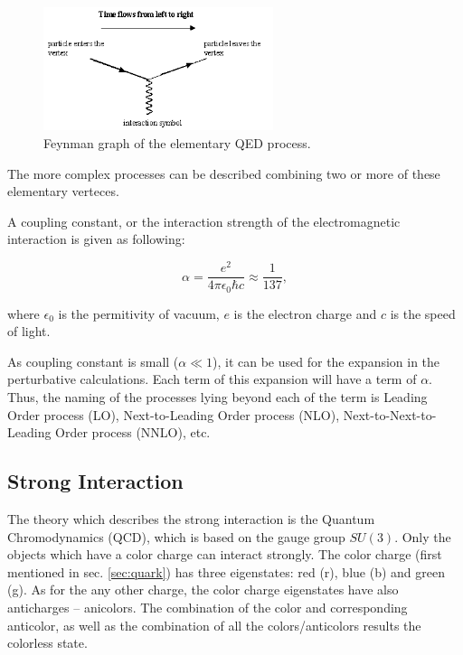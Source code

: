 \begin{figure}[h]
  \centering
  \includegraphics[width=0.6\textwidth]{01_Theory_SM/plots/QED_simple.png}
  \caption{Feynman graph of the elementary QED process.}
  \label{fig:QED_simple}
\end{figure}

The more complex processes can be described combining two or more of these elementary verteces.

A coupling constant, or the interaction strength of the electromagnetic interaction is given as following:

\begin{equation}
 \alpha = \frac{e^{2}}{4\pi\epsilon_{0}\hbar c} \approx \frac{1}{137},
\end{equation}

where $\epsilon_{0}$ is the permitivity of vacuum, $e$ is the electron charge and $c$ is the speed of light.

As coupling constant is small ($\alpha \ll 1$), it can be used for the expansion in the perturbative calculations.
Each term of this expansion will have a term of $\alpha$. Thus, the naming of the processes lying beyond each of the term
is Leading Order process (LO), Next-to-Leading Order process (NLO), Next-to-Next-to-Leading Order process (NNLO), etc.

\subsection{Strong Interaction}\label{sec:strong_int}

The theory which describes the strong interaction is the Quantum Chromodynamics (QCD), which is based on the gauge group $SU(3)$. Only the
objects which have a color charge can interact strongly. The color charge (first mentioned in sec. \ref{sec:quark}) has three eigenstates:
red (r), blue (b) and green (g). As for the any other charge, the color charge eigenstates have also anticharges -- anicolors. The combination
of the color and corresponding anticolor, as well as the combination of all the colors/anticolors results the colorless state.

